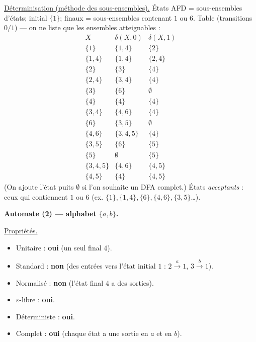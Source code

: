 \begin{corrections}
\begin{questions}
    \underline{Déterminisation (méthode des sous-ensembles).}
    États AFD = sous-ensembles d’états; initial $\{1\}$; finaux = sous-ensembles contenant $1$ ou $6$.
    Table (transitions $0/1$) — on ne liste que les ensembles atteignables :
    \[
    \renewcommand{\arraystretch}{1.2}
    \begin{array}{c|c|c}
      X & \delta(X,0) & \delta(X,1)\\\hline
      \{1\}     & \{1,4\} & \{2\}\\
      \{1,4\}   & \{1,4\} & \{2,4\}\\
      \{2\}     & \{3\}   & \{4\}\\
      \{2,4\}   & \{3,4\} & \{4\}\\
      \{3\}     & \{6\}   & \emptyset\\
      \{4\}     & \{4\}   & \{4\}\\
      \{3,4\}   & \{4,6\} & \{4\}\\
      \{6\}     & \{3,5\} & \emptyset\\
      \{4,6\}   & \{3,4,5\} & \{4\}\\
      \{3,5\}   & \{6\}   & \{5\}\\
      \{5\}     & \emptyset & \{5\}\\
      \{3,4,5\} & \{4,6\} & \{4,5\}\\
      \{4,5\}   & \{4\}   & \{4,5\}
    \end{array}
    \]
    (On ajoute l’état puits $\emptyset$ si l’on souhaite un DFA complet.)
    États \textit{acceptants} : ceux qui contiennent $1$ ou $6$ (ex. $\{1\},\{1,4\},\{6\},\{4,6\},\{3,5\}$…).

    \medskip

  \item \textbf{Automate (2) — alphabet $\{a,b\}$.}

    \underline{Propriétés.}
    \begin{itemize}
    \item Unitaire : \textbf{oui} (un seul final $4$).
    \item Standard : \textbf{non} (des entrées vers l’état initial $1$ : $2\xrightarrow{a}1$, $3\xrightarrow{b}1$).
    \item Normalisé : \textbf{non} (l’état final $4$ a des sorties).
    \item $\varepsilon$-libre : \textbf{oui}.
    \item Déterministe : \textbf{oui}.
    \item Complet : \textbf{oui} (chaque état a une sortie en $a$ et en $b$).
    \end{itemize}


\end{questions}
\end{corrections}
